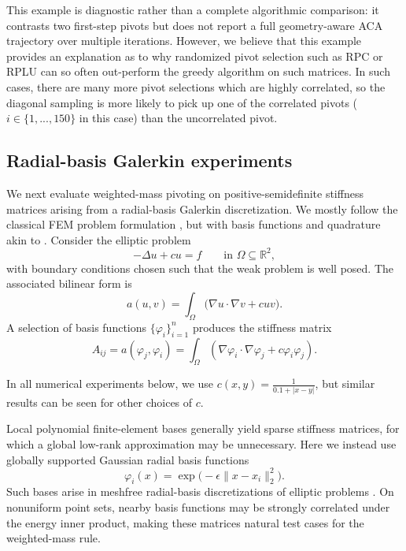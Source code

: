 \documentclass[11pt, preprint]{article}
\newcommand{\R}{\mathbb{R}}
\begin{document}
This example is diagnostic rather than a complete algorithmic comparison: it
contrasts two first-step pivots but does not report a full geometry-aware ACA
trajectory over multiple iterations. However, we believe that this example provides an explanation as to why randomized pivot selection such as RPC or RPLU \cite{Chen_RandomlyPivotedCholesky2025, Gilles_LowRankApproximationRandomly2026} can so often out-perform the greedy algorithm on such matrices. In such cases, there are many more pivot selections which are highly correlated, so the diagonal sampling is more likely to pick up one of the correlated pivots ($i\in\{1,...,150\}$ in this case) than the uncorrelated pivot. 

\subsection{Radial-basis Galerkin experiments}
\label{sec:galerkin_experiments}

We next evaluate weighted-mass pivoting on positive-semidefinite stiffness
matrices arising from a radial-basis Galerkin discretization. We mostly follow the classical FEM problem formulation \cite{larson_finite_2010}, but with basis functions and quadrature akin to \cite{shaw_radial_2025}. Consider the
elliptic problem
\[
    -\Delta u+cu=f
    \qquad\text{in }\Omega\subseteq\R^2,
\]
with boundary conditions chosen such that the weak problem is well posed. The
associated bilinear form is
\[
    a(u,v)
    =
    \int_\Omega
    \bigl(\nabla u\cdot\nabla v+cuv\bigr).
\]
A selection of basis functions $\{\varphi_i\}_{i=1}^n$ produces the stiffness matrix
\begin{equation}\label{eq:galerkin-stiffness}
    A_{ij}
    =
    a(\varphi_j,\varphi_i)
    =
    \int_\Omega
    \left(
        \nabla\varphi_i\cdot\nabla\varphi_j
        +
        c\varphi_i\varphi_j
    \right).
\end{equation}

In all numerical experiments below, we use $c(x,y)=\frac{1}{0.1 + |x-y|}$, but similar results can be seen for other choices of $c$. 

Local polynomial finite-element bases generally yield sparse stiffness
matrices, for which a global low-rank approximation may be unnecessary. Here
we instead use globally supported Gaussian radial basis functions
\begin{equation}\label{eq:gaussian-rbf}
    \varphi_i(x)
    =
    \exp\bigl(-\epsilon\|x-x_i\|_2^2\bigr).
\end{equation}
Such bases arise in meshfree radial-basis discretizations of elliptic
problems
\cite{Liu_MeshfreeRadialPoint2005,Kien_RadialBasisFunction2023}.
On nonuniform point sets, nearby basis functions may be strongly correlated
under the energy inner product, making these matrices natural test cases for
the weighted-mass rule.
\end{document}
